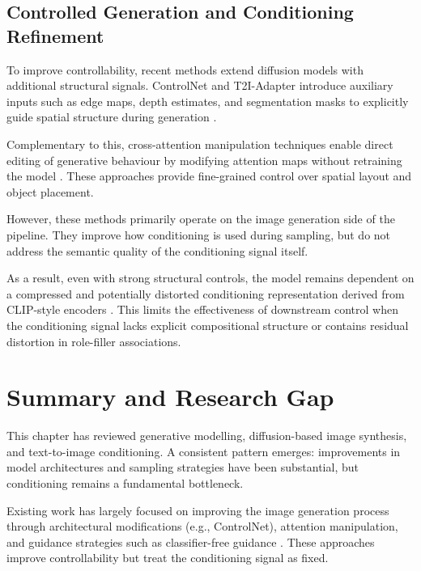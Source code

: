 \documentclass[a4paper,twoside,12pt]{report}
\begin{document}
\subsection{Controlled Generation and Conditioning Refinement}

To improve controllability, recent methods extend diffusion models with additional structural signals. ControlNet and T2I-Adapter introduce auxiliary inputs such as edge maps, depth estimates, and segmentation masks to explicitly guide spatial structure during generation \citep{zhang2023controlnet, mou2023t2iadapter}.

Complementary to this, cross-attention manipulation techniques enable direct editing of generative behaviour by modifying attention maps without retraining the model \citep{hertz2022prompt}. These approaches provide fine-grained control over spatial layout and object placement.

However, these methods primarily operate on the image generation side of the pipeline. They improve how conditioning is used during sampling, but do not address the semantic quality of the conditioning signal itself.

As a result, even with strong structural controls, the model remains dependent on a compressed and potentially distorted conditioning representation derived from CLIP-style encoders \citep{radford2021clip}. This limits the effectiveness of downstream control when the conditioning signal lacks explicit compositional structure or contains residual distortion in role-filler associations.



\section{Summary and Research Gap}

This chapter has reviewed generative modelling, diffusion-based image synthesis, and text-to-image conditioning. A consistent pattern emerges: improvements in model architectures and sampling strategies have been substantial, but conditioning remains a fundamental bottleneck.

Existing work has largely focused on improving the image generation process through architectural modifications (e.g., ControlNet), attention manipulation, and guidance strategies such as classifier-free guidance \citep{ho2022cfg, saharia2022imagen, zhang2023controlnet}. These approaches improve controllability but treat the conditioning signal as fixed.
\end{document}
